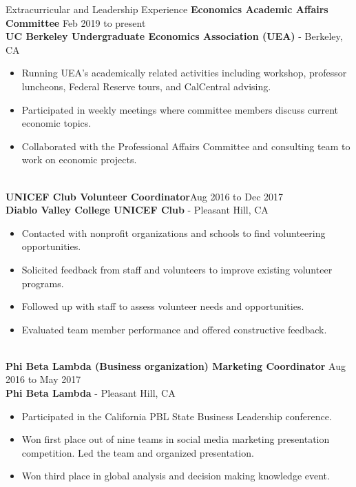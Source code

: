 \documentclass{resume}
\begin{document}
\begin{rSection}{ Extracurricular and Leadership Experience}
{\bf Economics Academic Affairs Committee	}\hfill{Feb 2019 to present
}{}
\\{\bf UC Berkeley Undergraduate Economics Association (UEA)} - Berkeley, CA
\begin{itemize}
    \item Running UEA’s academically related activities including workshop, professor luncheons, Federal Reserve tours, and CalCentral advising.
    \item Participated in weekly meetings where committee members discuss current economic topics.
    \item Collaborated with the Professional Affairs Committee and consulting team to work on economic projects.
\end{itemize}

\\{\bf UNICEF Club Volunteer Coordinator}\hfill {Aug 2016 to Dec 2017}{}
\\{\bf Diablo Valley College UNICEF Club} - Pleasant Hill, CA
\begin{itemize}
    \item Contacted with nonprofit organizations and schools to find volunteering opportunities.
    \item Solicited feedback from staff and volunteers to improve existing volunteer programs.
    \item Followed up with staff to assess volunteer needs and opportunities.
    \item Evaluated team member performance and offered constructive feedback.
\end{itemize}

\\{\bf Phi Beta Lambda (Business organization) Marketing Coordinator }\hfill {Aug 2016 to May 2017}{}
\\{\bf Phi Beta Lambda} - Pleasant Hill, CA
\begin{itemize}
    \item Participated in the California PBL State Business Leadership conference.
    \item Won first place out of nine teams in social media marketing presentation competition. Led the team and organized presentation.
    \item Won third place in global analysis and decision making knowledge event.
\end{itemize}
\end{rSection}
\end{document}
